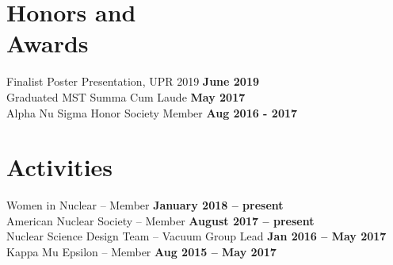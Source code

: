 \documentclass[margin,line]{resume}
\begin{document}
\begin{resume}
    \section{\mysidestyle Honors and\\Awards}
    Finalist Poster Presentation, UPR 2019 \hfill \textbf{June 2019}\\
    Graduated MST Summa Cum Laude \hfill \textbf{May 2017}\\
    Alpha Nu Sigma Honor Society Member \hfill \textbf{Aug 2016 - 2017}
    
    \section{\mysidestyle Activities}
    Women in Nuclear – Member \hfill \textbf{January 2018 -- present}\\
    American Nuclear Society – Member \hfill \textbf{August 2017 -- present}\\
    Nuclear Science Design Team – Vacuum Group Lead \hfill \textbf{Jan 2016 -- May 2017}\\
    Kappa Mu Epsilon – Member \hfill \textbf{Aug 2015 -- May 2017}


\end{resume}
\end{document}
